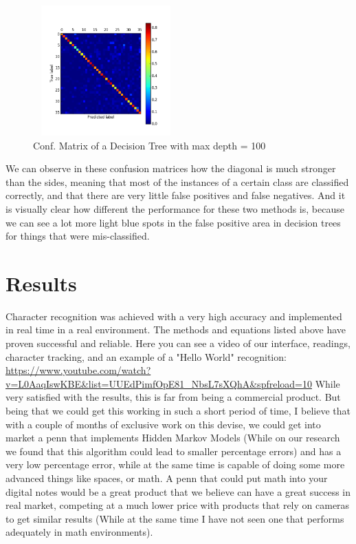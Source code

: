 \documentclass{article}
\begin{document}
\begin{figure}[H]
	\centering
	\includegraphics[width=0.5\textwidth, height= 5cm]{cm_tree1_dt.png}
	\caption{Conf. Matrix of a Decision Tree with max depth = 100}
\end{figure} 
We can observe in these confusion matrices how the diagonal is much stronger than the sides, meaning that most of the instances of a certain class are classified correctly, and that there are very little false positives and false negatives.
And it is visually clear how different the performance for these two methods is, because we can see a lot more light blue spots in the false positive area in decision trees for things that were mis-classified.


\section{Results}
Character recognition was achieved with a very high accuracy and implemented in real time in a real environment. The methods and equations listed above have proven successful and reliable.\newline
Here you can see a video of our interface, readings, character tracking, and an example of a "Hello World" recognition: 
\url{https://www.youtube.com/watch?v=L0AaqIswKBE&list=UUEdPimfOpE81_NbsL7sXQhA&spfreload=10} \newline \newline
While very satisfied with the results, this is far from being a commercial product. But being that we could get this working in such a short period of time, I believe that with a couple of months of exclusive work on this devise, we could get into market a penn that implements Hidden Markov Models (While on our research we found that this algorithm could lead to smaller percentage errors) and has a very low percentage error, while at the same time is capable of doing some more advanced things like spaces, or math. A penn that could put math into your digital notes would be a great product that we believe can have a great success in real market, competing at a much lower price with products that rely on cameras to get similar results (While at the same time I have not seen one that performs adequately in math environments).
\end{document}

